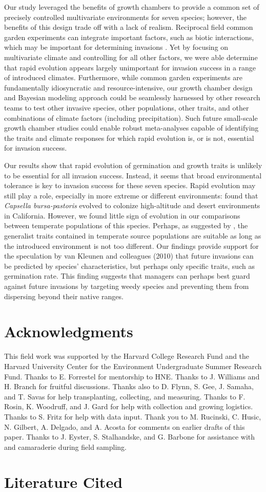 \documentclass[12pt]{article}\usepackage[]{graphicx}\usepackage[]{color}
\begin{document}
	Our study leveraged the benefits of growth chambers to provide a common set of precisely controlled multivariate environments for seven species; however, the benefits of this design  trade off with a lack of realism. Reciprocal field common garden experiments can integrate important factors, such as biotic interactions, which may be important for determining invasions \parencite{Germain2018,Blois2013}. Yet by focusing on multivariate climate and controlling for all other factors, we were able determine that rapid evolution appears largely unimportant for invasion success in a range of introduced climates. Furthermore, while common garden experiments are fundamentally idiosyncratic and resource-intensive, our growth chamber design and Bayesian modeling approach could be seamlessly harnessed by other research teams to test other invasive species, other populations, other traits, and other combinations of climate factors (including precipitation). Such future small-scale growth chamber studies could enable robust meta-analyses capable of identifying the traits and climate responses for which rapid evolution is, or is not, essential for invasion success. 
	
	Our results show that rapid evolution of germination and growth traits is unlikely to be essential for all invasion success. Instead, it seems that broad environmental tolerance is key to invasion success for these seven species. Rapid evolution may still play a role, especially in more extreme or different environments:  \textcite{Linde2001} found that \textit{Capsella bursa-pastoris} evolved to colonize high-altitude and desert environments in California. However, we found little sign of evolution in our comparisons between temperate populations of this species. Perhaps, as suggested by \textcite{Baker1965}, the generalist traits contained in temperate source populations are suitable as long as the introduced environment is not too different. Our findings provide support for  the speculation by van Kleunen and colleagues (2010) that future invasions can be predicted by species' characteristics, but perhaps only specific traits, such as germination rate. This finding suggests that managers can perhaps best guard against future invasions by targeting weedy species and preventing them from dispersing beyond their native ranges. 
\section{Acknowledgments}
This field work was supported by the Harvard College Research Fund and the Harvard University Center for the Environment Undergraduate Summer Research Fund. Thanks to E. Forrestel for mentorship to HNE. Thanks to J. Williams and H. Branch for fruitful discussions. Thanks also to D. Flynn, S. Gee, J. Samaha, and T. Savas for help transplanting, collecting, and measuring. Thanks to F. Rosin, K. Woodruff, and J. Gard for help with collection and growing logistics. Thanks to S. Fritz for help with data input. Thank you to M. Rucinski, C. Husic, N. Gilbert, A. Delgado, and A. Acosta for comments on earlier drafts of this paper. Thanks to J. Eyster, S. Stalhandske, and G. Barbone for assistance with and camaraderie during field sampling. 

	

\section{Literature Cited}
\printbibliography
\end{document}
